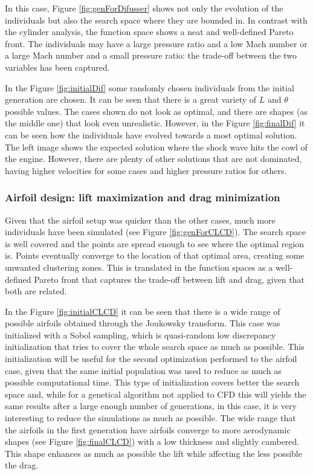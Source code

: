 In this case, Figure \ref{fig:genForDifusser} shows not only the evolution of the individuals but also the search space where they are bounded in. In contrast with the cylinder analysis, the function space shows a neat and well-defined Pareto front. The individuals may have a large pressure ratio and a low Mach number or a large Mach number and a small pressure ratio: the trade-off between the two variables has been captured.

In the Figure \ref{fig:initialDif} some randomly chosen individuals from the initial generation are chosen. It can be seen that there is a great variety of $L$ and $\theta$ possible values. The cases shown do not look as optimal, and there are shapes (as the middle one) that look even unrealistic. However, in the Figure \ref{fig:finalDif} it can be seen how the individuals have evolved towards a most optimal solution. The left image shows the expected solution where the shock wave hits the cowl of the engine. However, there are plenty of other solutions that are not dominated, having higher velocities for some cases and higher pressure ratios for others. 

\subsubsection*{Airfoil design: lift maximization and drag minimization}


Given that the airfoil setup was quicker than the other cases, much more individuals have been simulated (see Figure \ref{fig:genForCLCD}). The search space is well covered and the points are spread enough to see where the optimal region is. Points eventually converge to the location of that optimal area, creating some unwanted clustering zones. This is translated in the function spaces as a well-defined Pareto front that captures the trade-off between lift and drag, given that both are related. 

In the Figure \ref{fig:initialCLCD} it can be seen that there is a wide range of possible airfoils obtained through the Joukowsky transform. This case was initialized with a Sobol sampling, which is quasi-random low discrepancy initialization that tries to cover the whole search space as much as possible. This initialization will be useful for the second optimization performed to the airfoil case, given that the same initial population was used to reduce as much as possible computational time. This type of initialization covers better the search space and, while for a genetical algorithm not applied to CFD this will yields the same results after a large enough number of generations, in this case, it is very interesting to reduce the simulations as much as possible. The wide range that the airfoils in the first generation have airfoils converge to more aerodynamic shapes (see Figure \ref{fig:finalCLCD}) with a low thickness and slightly cambered. This shape enhances as much as possible the lift while affecting the less possible the drag. 


